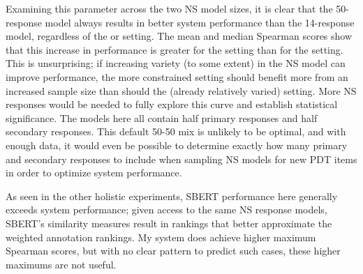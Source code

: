 Examining this parameter across the two NS model sizes, it is clear that the 50-response model always results in better system performance than the 14-response model, regardless of the  or  setting. The mean and median Spearman scores show that this increase in performance is greater for the  setting than for the  setting. This is unsurprising; if increasing variety (to some extent) in the NS model can improve performance, the more constrained  setting should benefit more from an increased sample size than should the (already relatively varied)  setting. More NS responses would be needed to fully explore this curve and establish statistical significance. The  models here all contain half primary responses and half secondary responses. This default 50-50 mix is unlikely to be optimal, and with enough data, it would even be possible to determine exactly how many primary and secondary responses to include when sampling NS models for new PDT items in order to optimize system performance.

As seen in the other holistic experiments, SBERT performance here generally exceeds system performance; given access to the same NS response models, SBERT's similarity measures result in rankings that better approximate the weighted annotation rankings. My system does achieve higher maximum Spearman scores, but with no clear pattern to predict such cases, these higher maximums are not useful.

